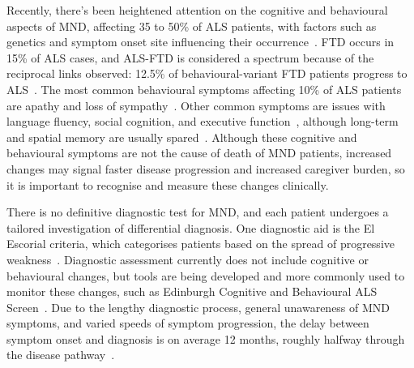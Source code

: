 Recently, there's been heightened attention on the cognitive and behavioural aspects of MND, affecting 35 to 50\% of ALS patients, with factors such as genetics and symptom onset site influencing their occurrence~\cite{yangRiskFactorsCognitive2021, chioALSPhenotypeInfluenced2020}.
FTD occurs in 15\% of ALS cases, and ALS-FTD is considered a spectrum because of the reciprocal links observed: 12.5\% of behavioural-variant FTD patients progress to ALS~\cite{strongAmyotrophicLateralSclerosis2017}.
The most common behavioural symptoms affecting 10\% of ALS patients are apathy and loss of sympathy~\cite{abrahamsScreeningCognitionBehaviour2014}.
Other common symptoms are issues with language fluency, social cognition, and executive function~\cite{beeldmanCognitiveProfileALS2016}, although long-term and spatial memory are usually spared~\cite{crockfordALSspecificCognitiveBehavior2018}.
Although these cognitive and behavioural symptoms are not the cause of death of MND patients, increased changes may signal faster disease progression and increased caregiver burden, so it is important to recognise and measure these changes clinically.

There is no definitive diagnostic test for MND, and each patient undergoes a tailored investigation of differential diagnosis.
One diagnostic aid is the El Escorial criteria, which categorises patients based on the spread of progressive weakness~\cite{ludolphRevisionEscorialCriteria2015}.
Diagnostic assessment currently does not include cognitive or behavioural changes, but tools are being developed and more commonly used to monitor these changes, such as Edinburgh Cognitive and Behavioural ALS Screen~\cite{abrahamsScreeningCognitionBehaviour2014}.
Due to the lengthy diagnostic process, general unawareness of MND symptoms, and varied speeds of symptom progression, the delay between symptom onset and diagnosis is on average 12 months, roughly halfway through the disease pathway~\cite{mitchellTimelinesDiagnosticEvaluation2010}.


